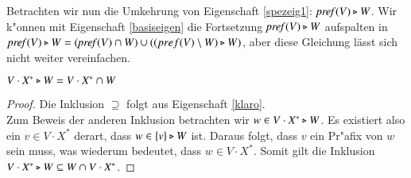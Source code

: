 Betrachten wir nun die Umkehrung von Eigenschaft \ref{spezeig1}: $\mathit{pref{(}}V)\triangleright W$. Wir k"onnen mit Eigenschaft \ref{basiseigen} die Fortsetzung $\mathit{pref{(}}V)\triangleright W$ aufspalten in $\mathit{pref{(}}V)\triangleright W= (\mathit{pref{(}}V)\cap W) \cup ((pref(V)\setminus W)\triangleright W)$, aber diese Gleichung lässt sich nicht weiter vereinfachen.


\vspace{2ex}

\begin{eigen}
$V\cdot X^* \triangleright W = V\cdot X^* \cap W$
\end{eigen}
\begin{proof}
Die Inklusion $\supseteq$ folgt aus Eigenschaft \ref{klaro}.\\
Zum Beweis der anderen Inklusion betrachten wir $w\in V\cdot X^* \triangleright W$. Es existiert also ein $v\in V\cdot X^*$ derart, dass $w\in \{v\}\triangleright W$ ist. Daraus folgt, dass $v$ ein Pr"afix von $w$ sein muss, was wiederum bedeutet, dass $w\in V\cdot X^*$. Somit gilt die Inklusion $V\cdot X^* \triangleright W \subseteq W\cap V\cdot X^*$.
\end{proof}


